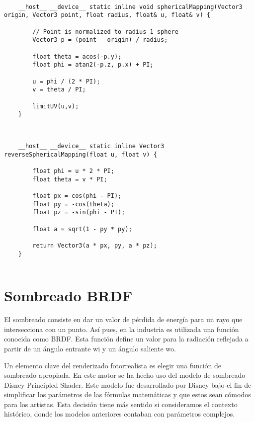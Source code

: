 	\begin{lstlisting}
	
    __host__ __device__ static inline void sphericalMapping(Vector3 origin, Vector3 point, float radius, float& u, float& v) {

        // Point is normalized to radius 1 sphere
        Vector3 p = (point - origin) / radius;

        float theta = acos(-p.y);
        float phi = atan2(-p.z, p.x) + PI;

        u = phi / (2 * PI);
        v = theta / PI;

        limitUV(u,v);
    }
	
	\end{lstlisting}
	
	\begin{lstlisting}
		
	__host__ __device__ static inline Vector3 reverseSphericalMapping(float u, float v) {

        float phi = u * 2 * PI;
        float theta = v * PI;

        float px = cos(phi - PI);
        float py = -cos(theta);
        float pz = -sin(phi - PI);

        float a = sqrt(1 - py * py);

        return Vector3(a * px, py, a * pz);
    }
	
	\end{lstlisting}
	
	\section{Sombreado BRDF}
	
		
	El sombreado consiste en dar un valor de pérdida de energía para un rayo que intersecciona con un punto. Así pues, en la industria es utilizada una función conocida como BRDF. Esta función define un valor para la radiación reflejada a partir de un ángulo entrante wi y un ángulo saliente wo.

	Un elemento clave del renderizado fotorrealista es elegir una función de sombreado apropiada. En este motor se ha hecho uso del modelo de sombreado Disney Principled Shader. Este modelo fue desarrollado por Disney bajo el fin de simplificar los parámetros de las fórmulas matemáticas y que estos sean cómodos para los artistas. Esta decisión tiene más sentido si consideramos el contexto histórico, donde los modelos anteriores contaban con parámetros complejos.

